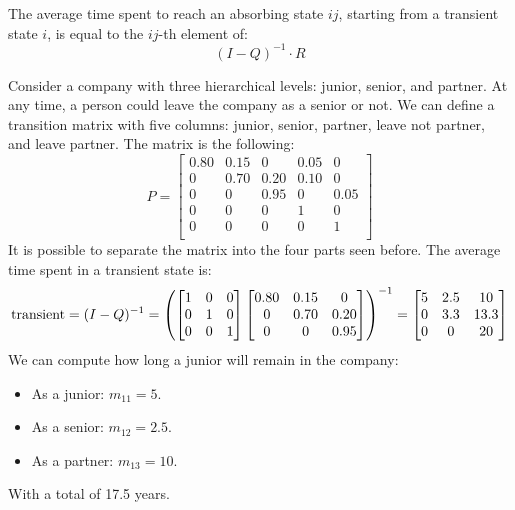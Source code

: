 The average time spent to reach an absorbing state $ij$, starting from a transient state $i$, is equal to the $ij$-th element of: 
\[(I-Q)^{-1} \cdot R\]
\begin{example}
    Consider a company with three hierarchical levels: junior, senior, and partner. 
    At any time, a person could leave the company as a senior or not. 
    We can define a transition matrix with five columns: junior, senior, partner, leave not partner, and leave partner. 
    The matrix is the following:
    \[P= 
    \begin{bmatrix}
        0.80    & 0.15  & 0     & 0.05  & 0 \\
        0       & 0.70  & 0.20  & 0.10  & 0 \\
        0       & 0     & 0.95  & 0     & 0.05 \\
        0       & 0     & 0     & 1     & 0 \\
        0       & 0     & 0     & 0     & 1 \\
    \end{bmatrix}\]
    It is possible to separate the matrix into the four parts seen before.
    The average time spent in a transient state is:
    \[\textnormal{transient}=(I-Q)^{-1}=\left(  
        \begin{bmatrix}
            1       & 0     & 0  \\
            0       & 1     & 0  \\
            0       & 0     & 1  \\
        \end{bmatrix}
        \begin{bmatrix}
            0.80    & 0.15  & 0     \\
            0       & 0.70  & 0.20  \\
            0       & 0     & 0.95  \\
        \end{bmatrix}\right)^{-1}=        
    \begin{bmatrix}
        5       & 2.5   & 10    \\
        0       & 3.3   & 13.3  \\
        0       & 0     & 20    \\
    \end{bmatrix}\]
    We can compute how long a junior will remain in the company:
    \begin{itemize}
        \item As a junior: $m_{11}=5$.
        \item As a senior: $m_{12}=2.5$.
        \item As a partner: $m_{13}=10$.
    \end{itemize}
    With a total of 17.5 years.


\end{example}
